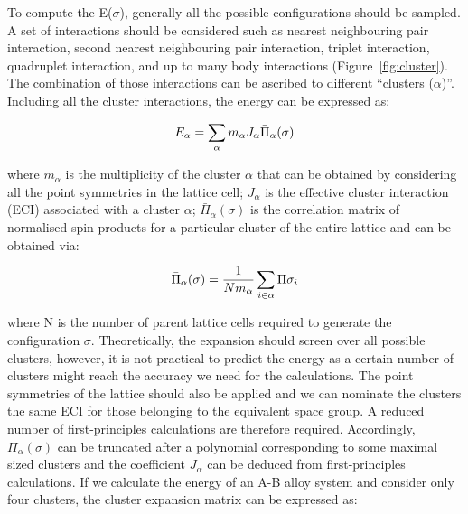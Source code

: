 \documentclass[../main.tex]{subfiles}
\begin{document}
To compute the E($\sigma$), generally all the possible configurations should be sampled. A set of interactions should be considered such as nearest neighbouring pair interaction, second nearest neighbouring pair interaction, triplet interaction, quadruplet interaction, and up to many body interactions (Figure~\ref{fig:cluster}). The combination of those interactions can be ascribed to different ``clusters ($\alpha$)''. Including all the cluster interactions, the energy can be expressed as:

\begin{equation}
    \centering
    {E}_{\alpha}=\sum_\alpha {m_\alpha}{J_\alpha}{\bar{\Pi}_\alpha(\sigma)}
    \label{eq:clusters}
\end{equation} 

where $m_\alpha$ is the multiplicity of the cluster $\alpha$ that can be obtained by considering all the point symmetries in the lattice cell; $J_\alpha$ is the effective cluster interaction (ECI) associated with a cluster $\alpha$; $\bar{\Pi}_\alpha(\sigma)$ is the correlation matrix of normalised spin-products for a particular cluster of the entire lattice and can be obtained via:

\begin{equation}
    \centering
    {\bar{\Pi}_\alpha(\sigma)}=\frac{1}{N{m_\alpha}}\sum_{i\in\alpha} {\Pi{\sigma_i}}
    \label{eq:correlation_matrix}
\end{equation} 

where N is the number of parent lattice cells required to generate the configuration $\sigma$. Theoretically, the expansion should screen over all possible clusters, however, it is not practical to predict the energy as a certain number of clusters might reach the accuracy we need for the calculations. The point symmetries of the lattice should also be applied and we can nominate the clusters the same ECI for those belonging to the equivalent space group.\cite{van2001first} A reduced number of first-principles calculations are  therefore required. Accordingly, $\Pi_\alpha(\sigma)$ can be truncated after a polynomial corresponding to some maximal sized clusters and the coefficient $J_\alpha$ can be deduced from first-principles calculations. If we calculate the energy of an A-B alloy system and consider only four clusters, the cluster expansion matrix can be expressed as:
\end{document}
